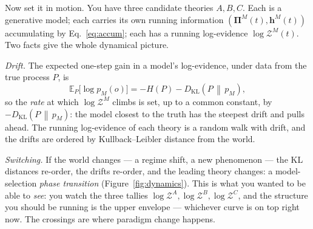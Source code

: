 \documentclass[11pt]{article}
\newcommand{\E}{\mathbb{E}}
\newcommand{\KL}[2]{D_{\mathrm{KL}}\!\left(#1\,\middle\|\,#2\right)}
\newcommand{\Prec}{\bm{\Pi}}        %
\newcommand{\hvec}{\bm{h}}          %
\newcommand{\Z}{\mathcal{Z}}        %
\theoremstyle{definition}
\begin{document}
Now set it in motion. You have three candidate theories $A,B,C$. Each is a
generative model; each carries its own running information
$(\Prec^M(t),\hvec^M(t))$ accumulating by Eq.~\eqref{eq:accum}; each has a
running log-evidence $\log\Z^M(t)$. Two facts give the whole dynamical
picture.

\emph{Drift.} The expected one-step gain in a model's log-evidence, under
data from the true process $P$, is
\begin{equation}
\E_{P}\!\big[\log p_M(o)\big]=-H(P)-\KL{P}{p_M},
\label{eq:drift}
\end{equation}
so the \emph{rate} at which $\log\Z^M$ climbs is set, up to a common
constant, by $-\KL{P}{p_M}$: the model closest to the truth has the
steepest drift and pulls ahead. The running log-evidence of each theory is
a random walk with drift, and the drifts are ordered by Kullback--Leibler
distance from the world.

\emph{Switching.} If the world changes --- a regime shift, a new
phenomenon --- the KL distances re-order, the drifts re-order, and the
leading theory changes: a model-selection \emph{phase transition}
(Figure~\ref{fig:dynamics}). This is what you wanted to be able to
\emph{see}: you watch the three tallies $\log\Z^A,\log\Z^B,\log\Z^C$, and
the structure you should be running is the upper envelope --- whichever
curve is on top right now. The crossings are where paradigm change
happens.
\end{document}
